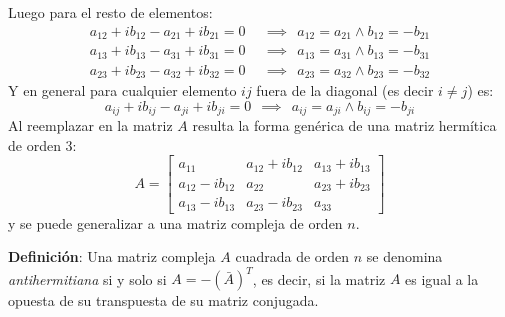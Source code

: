 Luego para el resto de elementos:
\begin{align*}
  a_{12} + ib_{12} - a_{21} + ib_{21} = 0 ~~ &\implies ~~ a_{12} = a_{21} \land b_{12} = - b_{21} \\ 
  a_{13} + ib_{13} - a_{31} + ib_{31} = 0 ~~ &\implies ~~ a_{13} = a_{31} \land b_{13} = - b_{31} \\ 
  a_{23} + ib_{23} - a_{32} + ib_{32} = 0 ~~ &\implies ~~ a_{23} = a_{32} \land b_{23} = - b_{32}
\end{align*}
Y en general para cualquier elemento \(ij\) fuera de la diagonal (es decir \(i\neq j\)) es:
\[
  a_{ij} + ib_{ij} - a_{ji} + ib_{ji} = 0 ~~ \implies ~~ a_{ij} = a_{ji} \land b_{ij} = - b_{ji} 
\]
Al reemplazar en la matriz \(A\) resulta la forma genérica de una matriz hermítica de orden 3:
\[
A = \begin{bmatrix}
  a_{11} & a_{12} + ib_{12} & a_{13} + ib_{13} \\
  a_{12} - ib_{12} & a_{22} & a_{23} + ib_{23} \\
  a_{13} - ib_{13} & a_{23} - ib_{23} & a_{33}
\end{bmatrix}
\]
y se puede generalizar a una matriz compleja de orden \(n\).

\textbf{Definición}: Una matriz compleja \(A\) cuadrada de orden \(n\) se denomina \textit{antihermitiana} si y solo si \(A = -(\bar{A})^T\), es decir, si la matriz \(A\) es igual a la opuesta de su transpuesta de su matriz conjugada.

